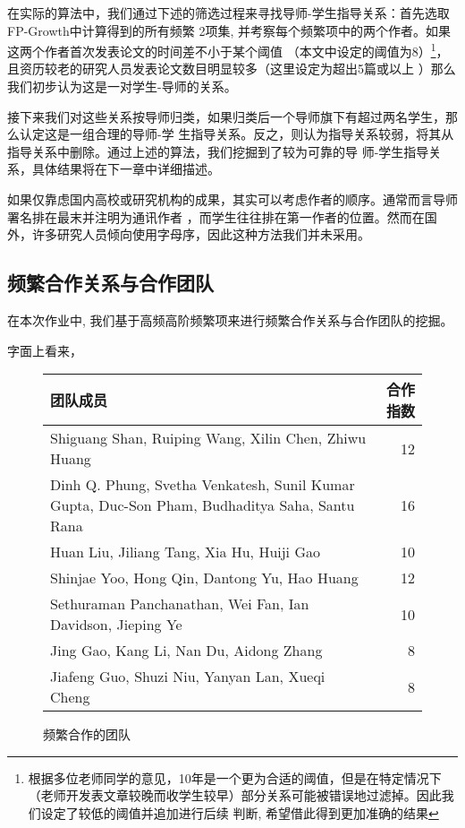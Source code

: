 \documentclass[a4paper]{article}
\begin{document}
在实际的算法中，我们通过下述的筛选过程来寻找导师-学生指导关系：首先选取FP-Growth中计算得到的所有频繁
2项集, 并考察每个频繁项中的两个作者。如果这两个作者首次发表论文的时间差不小于某个阈值
（本文中设定的阈值为8）\footnote{根据多位老师同学的意见，10年是一个更为合适的阈值，但是在特定情况下
（老师开发表文章较晚而收学生较早）部分关系可能被错误地过滤掉。因此我们设定了较低的阈值并追加进行后续
判断, 希望借此得到更加准确的结果}，且资历较老的研究人员发表论文数目明显较多（这里设定为超出5篇或以上
）那么我们初步认为这是一对学生-导师的关系。

接下来我们对这些关系按导师归类，如果归类后一个导师旗下有超过两名学生，那么认定这是一组合理的导师-学
生指导关系。反之，则认为指导关系较弱，将其从指导关系中删除。通过上述的算法，我们挖掘到了较为可靠的导
师-学生指导关系，具体结果将在下一章中详细描述。

如果仅靠虑国内高校或研究机构的成果，其实可以考虑作者的顺序。通常而言导师署名排在最末并注明为通讯作者
，而学生往往排在第一作者的位置。然而在国外，许多研究人员倾向使用字母序，因此这种方法我们并未采用。

\subsection{频繁合作关系与合作团队}
在本次作业中, 我们基于高频高阶频繁项来进行频繁合作关系与合作团队的挖掘。

字面上看来，
\begin{figure}[ht]
  \begin{center}
    \begin{tabular}{m{12cm}r}
      \hline
      团队成员 & 合作指数 \\
      \hline
      Shiguang Shan, Ruiping Wang, Xilin Chen, Zhiwu Huang & 12 \\
      Dinh Q. Phung, Svetha Venkatesh, Sunil Kumar Gupta, Duc-Son Pham, Budhaditya Saha, Santu Rana
      & 16 \\
      Huan Liu, Jiliang Tang, Xia Hu, Huiji Gao & 10 \\
      Shinjae Yoo, Hong Qin, Dantong Yu, Hao Huang & 12 \\
      Sethuraman Panchanathan, Wei Fan, Ian Davidson, Jieping Ye & 10 \\
      Jing Gao, Kang Li, Nan Du, Aidong Zhang & 8 \\
      Jiafeng Guo, Shuzi Niu, Yanyan Lan, Xueqi Cheng & 8 \\
      \hline
    \end{tabular}
  \end{center}
  \caption{频繁合作的团队}
\end{figure}
\end{document}
